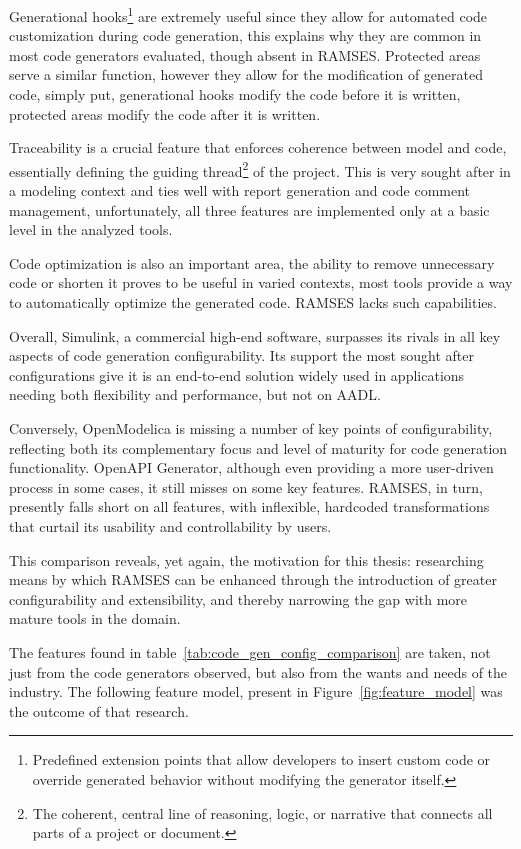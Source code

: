Generational hooks\footnote{Predefined extension points that allow developers to insert custom code or override generated behavior without modifying the generator itself.} are extremely useful since they allow for automated code customization during code generation, this explains why they are common in most code generators evaluated, though absent in \gls{RAMSES}. Protected areas serve a similar function, however they allow for the modification of generated code, simply put, generational hooks modify the code before it is written, protected areas modify the code after it is written.

Traceability is a crucial feature that enforces coherence between model and code, essentially defining the guiding thread\footnote{The coherent, central line of reasoning, logic, or narrative that connects all parts of a project or document.} of the project. This is very sought after in a modeling context and ties well with report generation and code comment management, unfortunately, all three features are implemented only at a basic level in the analyzed tools.

Code optimization is also an important area, the ability to remove unnecessary code or shorten it proves to be useful in varied contexts, most tools provide a way to automatically optimize the generated code. \gls{RAMSES} lacks such capabilities.

Overall, Simulink, a commercial high-end software, surpasses its rivals in all key aspects of code generation configurability. Its support the most sought after configurations give it is an end-to-end solution widely used in applications needing both flexibility and performance, but not on \gls{AADL}.

Conversely, OpenModelica is missing a number of key points of configurability, reflecting both its complementary focus and level of maturity for code generation functionality. OpenAPI Generator, although even providing a more user-driven process in some cases, it still misses on some key features. \gls{RAMSES}, in turn, presently falls short on all features, with inflexible, hardcoded transformations that curtail its usability and controllability by users.

This comparison reveals, yet again, the motivation for this thesis: researching means by which \gls{RAMSES} can be enhanced through the introduction of greater configurability and extensibility, and thereby narrowing the gap with more mature tools in the domain.

The features found in table~\ref{tab:code_gen_config_comparison} are taken, not just from the code generators observed, but also from the wants and needs of the industry. The following feature model, present in Figure~\ref{fig:feature_model} was the outcome of that research.

